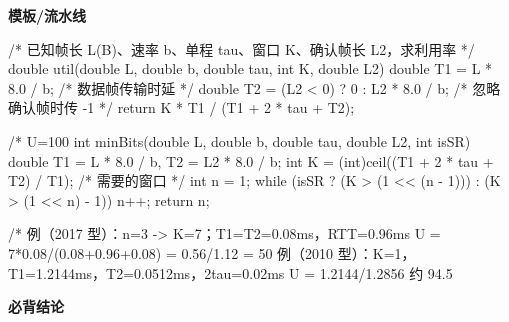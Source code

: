 \documentclass[10pt,a4paper]{ctexart}
\begin{document}

\textbf{模板/流水线}

\begin{codebox}
/* 已知帧长 L(B)、速率 b、单程 tau、窗口 K、确认帧长 L2，求利用率 */
double util(double L, double b, double tau, int K, double L2) {
    double T1 = L * 8.0 / b;                   /* 数据帧传输时延 */
    double T2 = (L2 < 0) ? 0 : L2 * 8.0 / b;   /* 忽略确认帧时传 -1 */
    return K * T1 / (T1 + 2 * tau + T2);
}

/* U=100%
int minBits(double L, double b, double tau, double L2, int isSR) {
    double T1 = L * 8.0 / b, T2 = L2 * 8.0 / b;
    int K = (int)ceil((T1 + 2 * tau + T2) / T1);      /* 需要的窗口 */
    int n = 1;
    while (isSR ? (K > (1 << (n - 1))) : (K > (1 << n) - 1)) n++;
    return n;
}

/* 例（2017 型）：n=3 -> K=7；T1=T2=0.08ms，RTT=0.96ms
   U = 7*0.08/(0.08+0.96+0.08) = 0.56/1.12 = 50%
   例（2010 型）：K=1，T1=1.2144ms，T2=0.0512ms，2tau=0.02ms
   U = 1.2144/1.2856 约 94.5%
\end{codebox}




\textbf{必背结论}
\end{document}
